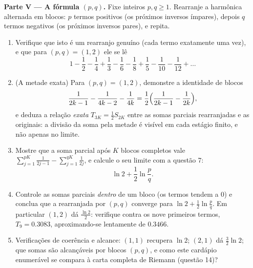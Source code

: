 \begin{problem}[{Problema de fim de semana --- $H_n = \ln n + \gamma +
\frac{1}{2n} + O(n^{-2})$, e rearranjar $1 - \frac12 +
\frac13 - \dots$ para $\frac{\ln 2}{2}$}]
\medskip
\noindent\textbf{Parte V --- A fórmula $(p, q)$.} Fixe inteiros
$p, q \geq 1$. Rearranje a  harmônica alternada em
blocos: $p$ termos positivos (os próximos inversos ímpares), depois
$q$ termos negativos (os próximos inversos pares), e repita.
\begin{enumerate}[resume]
  \item Verifique que isto é um rearranjo genuíno (cada termo
        exatamente uma vez), e que para $(p, q) = (1, 2)$ ele se lê
        \[
        1 - \frac12 - \frac14 + \frac13 - \frac16 - \frac18 +
        \frac15 - \frac1{10} - \frac1{12} + \dots
        \]
  \item (A metade exata) Para $(p, q) = (1, 2)$, demonstre a
        identidade de blocos
        \[
        \frac{1}{2k-1} - \frac{1}{4k-2} - \frac{1}{4k}
        = \frac12\Bigl(\frac{1}{2k-1} - \frac{1}{2k}\Bigr),
        \]
        e deduza a relação \emph{exata} $T_{3K} = \frac12
        S_{2K}$ entre as somas
        parciais rearranjadas e as originais: a divisão da soma
        pela metade é visível em cada estágio finito, e não apenas
        no limite.
  \item Mostre que a soma parcial após $K$ blocos completos
        vale $\sum_{j=1}^{pK} \frac{1}{2j-1} -
        \sum_{j=1}^{qK} \frac{1}{2j}$, e calcule o seu limite
        com a questão 7:
        \[
        \ln 2 + \frac12 \ln\frac pq .
        \]
  \item Controle as somas parciais \emph{dentro} de um bloco (os
        termos tendem a $0$) e conclua que a  rearranjada por
        $(p,
        q)$ converge para $\ln 2 + \frac12\ln
        \frac pq$. Em particular $(1, 2)$ dá $\frac{\ln
        2}{2}$:
        verifique contra os nove primeiros termos, $T_9 =
        0.3083$,
        aproximando-se lentamente de $0.3466$.
  \item Verificações de coerência e alcance: $(1,1)$ recupera
        $\ln 2$; $(2,1)$ dá $\frac32\ln 2$; que somas são alcançáveis
        por blocos $(p, q)$, e como este cardápio enumerável se
        compara à carta completa de Riemann (questão 14)?
\end{enumerate}


\end{problem}
